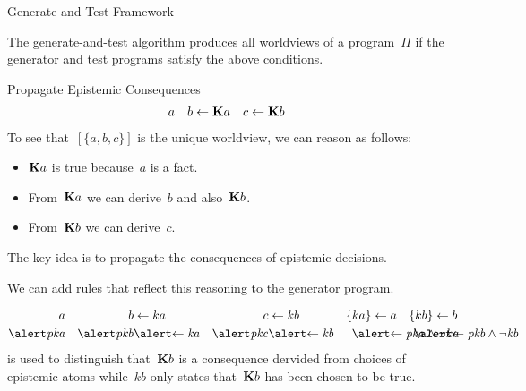 \documentclass[aspectratio=169,svgnames,xcolor=table,t]{beamer}
\begin{document}
\begin{frame}{Generate-and-Test Framework}
    \vspace{10pt}

    \begin{theorem}
        The generate-and-test algorithm produces all worldviews of a program~$\Pi$ if the generator and test programs satisfy the above conditions.
    \end{theorem}
\end{frame}
\begin{frame}{Propagate Epistemic Consequences}
    \vspace{-20pt}
    \begin{align*}
        a &&
        b &\leftarrow \mathbf{K} a
        &
        c &\leftarrow \mathbf{K} b
    \end{align*}
    To see that~$[\{a,b,c\}]$ is the unique worldview, we can reason as follows:
    \begin{itemize}
        \item $\mathbf{K} a$ is true because~$a$ is a fact.
        \item From~$\mathbf{K} a$ we can derive~$b$ and also~$\mathbf{K} b$.
        \item From~$\mathbf{K} b$ we can derive~$c$.
    \end{itemize}
    
    \pause
    \begin{myitemize}
        \item The key idea is to propagate the consequences of epistemic decisions.
        \item We can add rules that reflect this reasoning to the generator program.
    \end{myitemize}
    \begin{align*}
        a 
        && 
        b &\leftarrow ka
        &
        c &\leftarrow kb
        &
        \{ ka \} &\leftarrow a
        &
        \{ kb \} &\leftarrow b
        \\
        \hi{\kp{a}}&
        &
        \hi{\kp{b}} &\hi{\leftarrow \kk{a}}
        &
        \hi{\kp{c}} &\hi{\leftarrow \kk{b}}
        &
        \mathrlap{\hspace{-16pt}\hi{\leftarrow \kp{a} \wedge \neg ka}}
        &&
        \mathrlap{\hspace{-16pt}\hi{\leftarrow \kp{b} \wedge \neg \kk{b}}}
    \end{align*}
     is used to distinguish that~$\mathbf{K} b$ is a consequence dervided from choices of epistemic atoms while~$kb$ only states that~$\mathbf{K} b$ has been chosen to be true.
\end{frame}
\end{document}
